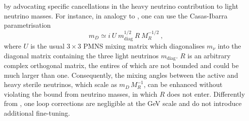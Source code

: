 by advocating specific cancellations in the heavy neutrino contribution to light neutrino masses.
For instance, in analogy to , one can use the Casas-Ibarra parametrisation~\cite{Casas:2001sr}
\begin{equation}
	\label{eq:CasasIbarra}
	m_D \simeq i \ U \ m_\text{diag}^{1/2}\ R\ M_R^{-1/2}\ ,
\end{equation}
where $U$ is the usual $3\times 3$ PMNS mixing matrix %
which diagonalises $m_\nu$ into the diagonal matrix containing the three light neutrinos $m_\text{diag}$.
$R$ is an arbitrary complex orthogonal matrix, the entires of which are not bounded and could be much larger than one.
Consequently, the mixing angles between the active and heavy sterile neutrinos, %
which scale as $m_D\, M_{R}^{-1}$, can be enhanced without violating the bound from neutrino masses, %
in which $R$ does not enter.
Differently from , one loop corrections are negligible at the GeV scale and do not introduce additional fine-tuning. 

